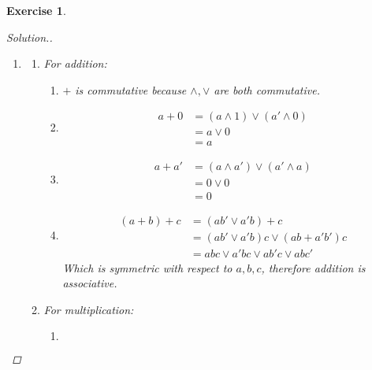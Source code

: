\documentclass{article}
\theoremstyle{breakstyle}
\newtheorem{exercise}{Exercise}
\newenvironment{solution}
  {\begin{proof}[Solution.]\renewcommand{\qedsymbol}{}}
  {\end{proof}}
\begin{document}
\begin{exercise}
\begin{solution}
    \begin{enumerate}[label=({\alph*})]
            \item 
                \begin{enumerate}[label=({\Roman*})]
                    \item For addition:
                        \begin{enumerate}[label=({\roman*})]
                            \item $+$ is commutative because $\wedge, \vee $ are both commutative.
                            \item 
                                \begin{align*}
                                    a+0&= (a\wedge 1)\vee (a'\wedge 0) \\
                                    &= a\vee 0 \\
                                    &= a
                                \end{align*}
                            \item 
                                \begin{align*}
                                    a+a'&= (a\wedge a')\vee (a'\wedge a) \\
                                    &= 0\vee 0 \\
                                    &=0
                                \end{align*}
                            \item 
                                \begin{align*}
                                    (a+b)+c&= (ab'\vee a'b)+c \\
                                    &= (ab'\vee a'b)c\vee (ab+a'b')c \\
                                    &= abc\vee a'bc\vee ab'c\vee abc'
                                \end{align*}
                                Which is symmetric with respect to $a,b,c$, therefore addition is associative.
                        \end{enumerate}
                    \item For multiplication:
                        \begin{enumerate}[label=({\roman*})]
                            \item 
                                $$
$$
\end{enumerate}
\end{enumerate}
\end{enumerate}
\end{solution}
\end{exercise}
\end{document}
